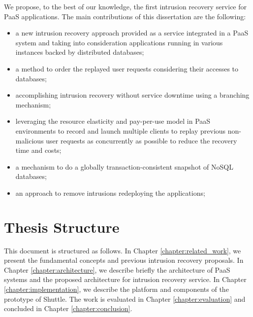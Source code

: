 We propose, to the best of our knowledge, the first intrusion recovery service for \ac{PaaS} applications. The main contributions of this dissertation are the following:
\begin{itemize}
\item a new intrusion recovery approach provided as a service integrated in a \ac{PaaS} system and taking into consideration applications running in various instances backed by distributed databases;
\item a method to order the replayed user requests considering their accesses to databases;
\item accomplishing intrusion recovery without service downtime using a branching mechanism;
\item leveraging the resource elasticity and pay-per-use model in \ac{PaaS} environments to record and launch multiple clients to replay previous non-malicious user requests as concurrently as possible to reduce the recovery time and costs;
\item a mechanism to do a globally transaction-consistent snapshot of \acs{NoSQL} databases;
\item an approach to remove intrusions redeploying the applications;
\end{itemize}

\section{Thesis Structure}\label{sec:introduction:structure}
This document is structured as follows. In Chapter \ref{chapter:related_work}, we present the fundamental concepts and previous intrusion recovery proposals. In Chapter \ref{chapter:architecture}, we describe briefly the architecture of \ac{PaaS} systems and the proposed architecture for intrusion recovery service. In Chapter \ref{chapter:implementation}, we describe the platform and components of the prototype of Shuttle. The work is evaluated in Chapter \ref{chapter:evaluation} and concluded in Chapter \ref{chapter:conclusion}.